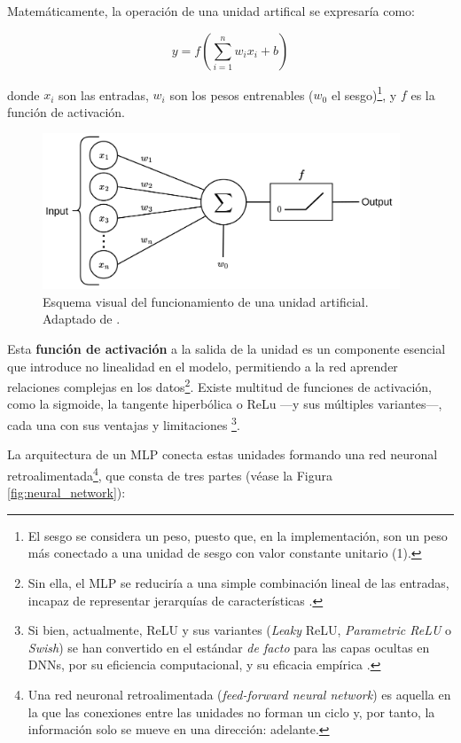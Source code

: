 Matemáticamente, la operación de una unidad artifical se expresaría como:

$$
y = f \left( \sum_{i=1}^n{w_ix_i+b} \right)
$$

donde $x_i$ son las entradas, $w_i$ son los pesos entrenables ($w_0$ el sesgo)\footnote{
    El sesgo se considera un peso, puesto que, en la implementación, son un peso más conectado a una unidad
    de sesgo con valor constante unitario (1).
}, y $f$ es la función de 
activación.

\begin{figure}[h]
    \centering
    \includegraphics[width=0.95\textwidth]{capitulos/cap_02/imagenes/Neuron_perceptron.png}
    \caption{
        Esquema visual del funcionamiento de una unidad artificial. Adaptado de 
        \cite{codeworld2022understandingMLDL}.
    } 
    \label{fig:neuron_MLP}
\end{figure}


Esta \textbf{función de activación} a la salida de la unidad es un componente esencial que introduce no 
linealidad en el modelo, permitiendo a la red aprender relaciones complejas en los datos\footnote{
    Sin ella, el MLP se reduciría a una simple combinación lineal de las entradas, incapaz de
    representar jerarquías de características \cite{murphy2022}.
}. Existe multitud de funciones de activación, 
como la sigmoide, la tangente hiperbólica o ReLu ---y sus múltiples variantes---, cada una con sus ventajas 
y limitaciones
\footnote{
    Si bien, actualmente, ReLU y sus variantes (\textit{Leaky} ReLU, \textit{Parametric ReLU} o 
    \textit{Swish}) se han convertido en el estándar \textit{de facto} para las capas ocultas en DNNs,
    por su eficiencia computacional, y su eficacia empírica \cite{vargas2021}.
}.

La arquitectura de un MLP conecta estas unidades formando una red neuronal retroalimentada\footnote{Una red 
neuronal retroalimentada (\textit{feed-forward neural network}) es aquella en la que las conexiones entre las 
unidades no forman un ciclo y, por tanto, la información solo se mueve en una dirección: adelante.},
que consta de tres partes (véase la Figura \ref{fig:neural_network}):


